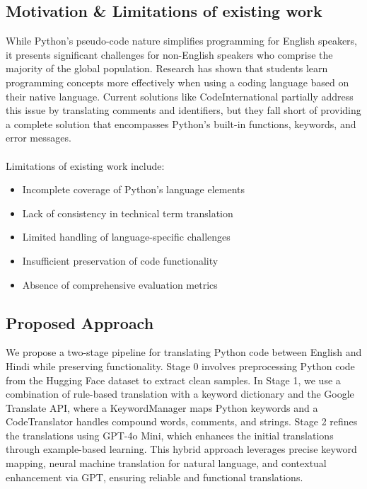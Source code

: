 \documentclass[11pt,a4paper]{article}
\begin{document}
            \subsection{Motivation \& Limitations of existing work} 
            While Python's pseudo-code nature simplifies programming for English speakers, it presents significant challenges for non-English speakers who comprise the majority of the global population. Research has shown that students learn programming concepts more effectively when using a coding language based on their native language. Current solutions like CodeInternational partially address this issue by translating comments and identifiers, but they fall short of providing a complete solution that encompasses Python's built-in functions, keywords, and error messages.\\ \\ 
            Limitations of existing work include:
            \begin{itemize}[itemsep=0pt, topsep=0pt]
                \item Incomplete coverage of Python's language elements
                \item Lack of consistency in technical term translation
                \item Limited handling of language-specific challenges
                \item Insufficient preservation of code functionality
                \item Absence of comprehensive evaluation metrics
            \end{itemize} 
            \subsection{Proposed Approach} 
            We propose a two-stage pipeline for translating Python code between English and Hindi while preserving functionality. Stage 0 involves preprocessing Python code from the Hugging Face dataset to extract clean samples. In Stage 1, we use a combination of rule-based translation with a keyword dictionary and the Google Translate API, where a KeywordManager maps Python keywords and a CodeTranslator handles compound words, comments, and strings. Stage 2 refines the translations using GPT-4o Mini, which enhances the initial translations through example-based learning. This hybrid approach leverages precise keyword mapping, neural machine translation for natural language, and contextual enhancement via GPT, ensuring reliable and functional translations.
            
\end{document}
